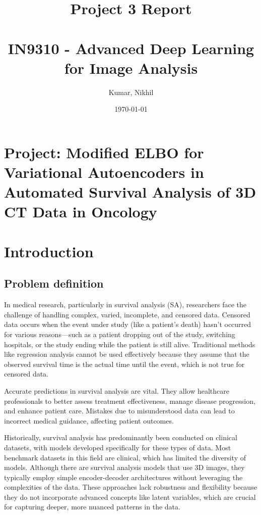 \documentclass{article}
\title{Project 3 Report  \\ \ \\IN9310 - Advanced Deep Learning for Image Analysis
}
\author{Kumar, Nikhil}
\date{\today}
\begin{document}
\maketitle


\section*{Project: Modified ELBO for Variational Autoencoders in Automated Survival Analysis of 3D CT Data in Oncology}


\section{Introduction}
\subsection{Problem definition}
In medical research, particularly in survival analysis (SA), researchers face the challenge of handling complex, varied, incomplete, and censored data. Censored data occurs when the event under study (like a patient's death) hasn't occurred for various reasons—such as a patient dropping out of the study, switching hospitals, or the study ending while the patient is still alive. Traditional methods like regression analysis cannot be used effectively because they assume that the observed survival time is the actual time until the event, which is not true for censored data.   

Accurate predictions in survival analysis are vital. They allow healthcare professionals to better assess treatment effectiveness, manage disease progression, and enhance patient care. Mistakes due to misunderstood data can lead to incorrect medical guidance, affecting patient outcomes.

Historically, survival analysis has predominantly been conducted on clinical datasets, with models developed specifically for these types of data. Most benchmark datasets in this field are clinical, which has limited the diversity of models. Although there are survival analysis models that use 3D images, they typically employ simple encoder-decoder architectures without leveraging the complexities of the data. These approaches lack robustness and flexibility because they do not incorporate advanced concepts like latent variables, which are crucial for capturing deeper, more nuanced patterns in the data. 
\end{document}
